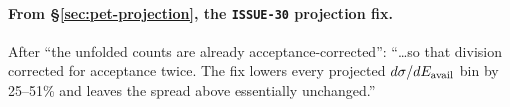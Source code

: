 \paragraph{From \S\ref{sec:pet-projection}, the \texttt{ISSUE-30} projection fix.} After ``the unfolded counts are already acceptance-corrected'': ``\ldots so that division corrected for acceptance twice. The fix lowers every projected $d\sigma/dE_{\mathrm{avail}}$ bin by 25--51\% and leaves the spread above essentially unchanged.''
